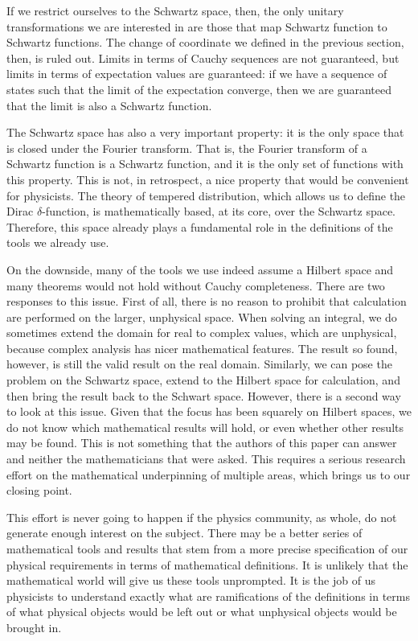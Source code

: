 \documentclass[10pt,twocolumn, nofootinbib]{revtex4-2}
\begin{document}
If we restrict ourselves to the Schwartz space, then, the only unitary transformations we are interested in are those that map Schwartz function to Schwartz functions. The change of coordinate we defined in the previous section, then, is ruled out. Limits in terms of Cauchy sequences are not guaranteed, but limits in terms of expectation values are guaranteed: if we have a sequence of states such that the limit of the expectation converge, then we are guaranteed that the limit is also a Schwartz function.

The Schwartz space has also a very important property: it is the only space that is closed under the Fourier transform. That is, the Fourier transform of a Schwartz function is a Schwartz function, and it is the only set of functions with this property. This is not, in retrospect, a nice property that would be convenient for physicists. The theory of tempered distribution, which allows us to define the Dirac $\delta$-function, is mathematically based, at its core, over the Schwartz space. Therefore, this space already plays a fundamental role in the definitions of the tools we already use.

On the downside, many of the tools we use indeed assume a Hilbert space and many theorems would not hold without Cauchy completeness. There are two responses to this issue. First of all, there is no reason to prohibit that calculation are performed on the larger, unphysical space. When solving an integral, we do sometimes extend the domain for real to complex values, which are unphysical, because complex analysis has nicer mathematical features. The result so found, however, is still the valid result on the real domain. Similarly, we can pose the problem on the Schwartz space, extend to the Hilbert space for calculation, and then bring the result back to the Schwart space. However, there is a second way to look at this issue. Given that the focus has been squarely on Hilbert spaces, we do not know which mathematical results will hold, or even whether other results may be found. This is not something that the authors of this paper can answer and neither the mathematicians that were asked. This requires a serious research effort on the mathematical underpinning of multiple areas, which brings us to our closing point.

This effort is never going to happen if the physics community, as whole, do not generate enough interest on the subject. There may be a better series of mathematical tools and results that stem from a more precise specification of our physical requirements in terms of mathematical definitions. It is unlikely that the mathematical world will give us these tools unprompted. It is the job of us physicists to understand exactly what are ramifications of the definitions in terms of what physical objects would be left out or what unphysical objects would be brought in.
\end{document}
